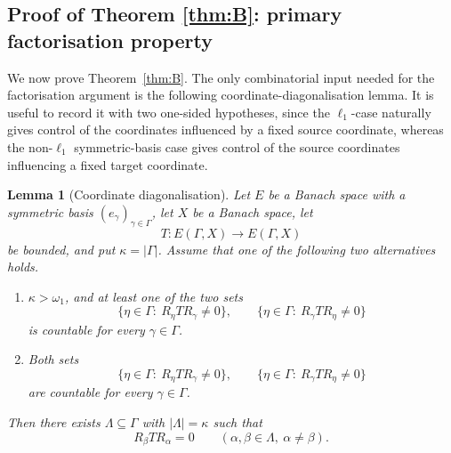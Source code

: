 \documentclass[11pt]{amsart}
\theoremstyle{plain}
\newtheorem{lemma}[theorem]{Lemma}
\theoremstyle{definition}
\numberwithin{equation}{section}
\newcommand{\abs}[1]{\left|#1\right|}
\begin{document}
\subsection{Proof of Theorem \ref{thm:B}: primary factorisation property}\label{sec:pfp}

We now prove Theorem~\ref{thm:B}.  The only combinatorial input needed for the factorisation argument is the following coordinate-diagonalisation lemma.  It is useful to record it with two one-sided hypotheses, since the $\ell_1$-case naturally gives control of the coordinates influenced by a fixed source coordinate, whereas the non-$\ell_1$ symmetric-basis case gives control of the source coordinates influencing a fixed target coordinate.

\begin{lemma}[Coordinate diagonalisation]\label{lem:coordinate-diagonalisation}
Let $E$ be a Banach space with a symmetric basis $(e_\gamma)_{\gamma\in\Gamma}$,
let $X$ be a Banach space, let
\[
    T\colon E(\Gamma,X)\to E(\Gamma,X)
\]
be bounded, and put $\kappa=\abs{\Gamma}$.  Assume that one of the following
two alternatives holds.

\begin{enumerate}[label=\textup{(\alph*)}, ref=\textup{(\alph*)}]
    \item\label{it:coord-hajnal-large}
    $\kappa>\omega_1$, and at least one of the two sets
    \[
        \{\eta\in\Gamma:\ R_\eta T R_\gamma\neq0\},
        \qquad
        \{\eta\in\Gamma:\ R_\gamma T R_\eta\neq0\}
    \]
    is countable for every $\gamma\in\Gamma$.

    \item\label{it:coord-two-sided}
    Both sets
    \[
        \{\eta\in\Gamma:\ R_\eta T R_\gamma\neq0\},
        \qquad
        \{\eta\in\Gamma:\ R_\gamma T R_\eta\neq0\}
    \]
    are countable for every $\gamma\in\Gamma$.
\end{enumerate}

Then there exists $\Lambda\subseteq\Gamma$ with $\abs{\Lambda}=\kappa$ such that
\[
    R_\beta T R_\alpha=0
    \qquad(\alpha,\beta\in\Lambda,\ \alpha\neq\beta).
\]
\end{lemma}
\end{document}
